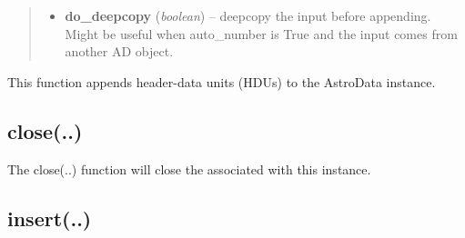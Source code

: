 \documentclass[letterpaper,10pt,english]{sphinxmanual}
\begin{document}
\begin{fulllineitems}
\begin{quote}
\begin{description}
\begin{itemize}
\item {} 
\textbf{do\_deepcopy} (\emph{boolean}) -- deepcopy the input before appending.  Might be useful
when auto\_number is True and the input comes from another AD object.

\end{itemize}

\end{description}\end{quote}

This function appends header-data units (HDUs) to the AstroData
instance.

\end{fulllineitems}



\subsection{close(..)}
\label{chapter_AstroDataClass:close}

\begin{fulllineitems}
\label{chapter_AstroDataClass:astrodata.data.AstroData.close}
The close(..) function will close the  associated with this
 instance.

\end{fulllineitems}



\subsection{insert(..)}
\label{chapter_AstroDataClass:insert}
\end{document}
